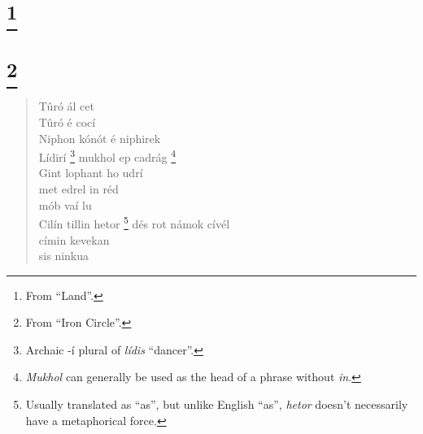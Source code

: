 \documentclass{article}
\let\oldthefootnote\thefootnote
\newcommand\oocfootnote[2][DarkGreen]{\renewcommand\thefootnote{\color{#1}\oldthefootnote}%
  \footnote{\color{#1}#2}%
  \renewcommand{\thefootnote}{\oldthefootnote}}
\begin{document}
\section{\oocfootnote{From ``Land''.}}


\begin{verse}
\end{verse}


\section{\oocfootnote{From ``Iron Circle''.}}


\begin{verse}


Tûró ál cet \\
Tûró é cocí \\
Niphon kónót é niphirek \\
Lídirí\oocfootnote{Archaic -í plural of \emph{lídis} ``dancer''.} mukhol ep cadrág\oocfootnote{\emph{Mukhol} can generally be used as the head of a phrase without \emph{in}.} \\
Gint lophant ho udrí \\
\hspace{1em} met edrel in réd \\
\hspace{1em} mób vaí lu \\
Cilín tillin hetor\oocfootnote{Usually translated as ``as'', but unlike English ``as'', \emph{hetor} doesn't necessarily have a metaphorical force.} dés rot námok cívél \\
\hspace{1em} címin kevekan \\
\hspace{1em} sis ninkua

\end{verse}
\end{document}
